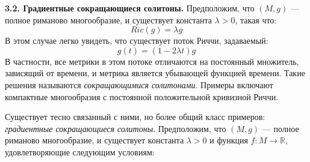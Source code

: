 \textbf{3.2. Градиентные сокращающиеся солитоны.} Предположим, что 
$(M,g)$ — полное риманово многообразие, и существует константа 
$\lambda >0$, такая что:
\[
    Ric(g)=\lambda g
\]
В этом случае легко увидеть, что существует поток Риччи, задаваемый:
\[
    g(t)=(1-2\lambda t)g
\]
В частности, все метрики в этом потоке отличаются на постоянный множитель, 
зависящий от времени, и метрика является убывающей функцией времени. 
Такие решения называются \textit{сокращающимися солитонами}. Примеры включают 
компактные многообразия с постоянной положительной кривизной Риччи.

Существует тесно связанный с ними, но более общий класс примеров: 
\textit{градиентные сокращающиеся солитоны}. Предположим, что 
$(M,g)$ — полное риманово многообразие, и существует константа 
$\lambda >0$ и функция $f:M \rightarrow \mathbb{R}$, удовлетворяющие следующим условиям: